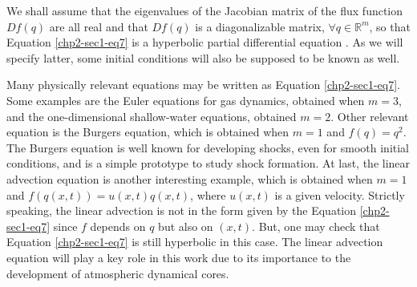 We shall assume that the eigenvalues of the Jacobian matrix of the flux function
$D{f}(q)$ are all real and that $D{f}(q)$ is a diagonalizable matrix,
$\forall q \in \mathbb{R}^m$, so that Equation \eqref{chp2-sec1-eq7}
is a hyperbolic partial differential equation \citep{leveque:1990}. As we will 
specify latter, some initial conditions will also be supposed to be known as well.

Many physically relevant equations may be written as Equation \eqref{chp2-sec1-eq7}.
Some examples are the Euler equations for gas dynamics, obtained when $m = 3$,
and the one-dimensional shallow-water equations, obtained $m = 2$.
Other relevant equation is the Burgers equation, which is obtained when
$m = 1$ and $f(q) = q^2$. The Burgers equation is well known for developing shocks,
even for smooth initial conditions, and is a simple prototype to study shock formation.
At last, the linear advection equation is another interesting example, which is obtained
when $m = 1$ and $f(q(x,t)) = u(x,t)q(x,t)$, where $u(x,t)$ is a given velocity.
Strictly speaking, the linear advection is not in the form given by the Equation
\eqref{chp2-sec1-eq7} since $f$ depends on $q$ but also on $(x,t)$.
But, one may check that Equation \eqref{chp2-sec1-eq7} is still hyperbolic
in this case. The linear advection equation will play a key role in this work due to its importance
to the development of atmospheric dynamical cores.

